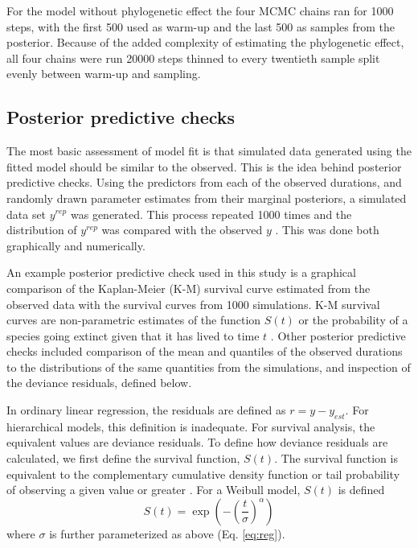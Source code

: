 \documentclass[12pt,letterpaper]{article}
\begin{document}
For the model without phylogenetic effect the four MCMC chains ran for 1000 steps, with the first 500 used as warm-up and the last 500 as samples from the posterior. Because of the added complexity of estimating the phylogenetic effect, all four chains were run 20000 steps thinned to every twentieth sample split evenly between warm-up and sampling. 



\subsection{Posterior predictive checks}

The most basic assessment of model fit is that simulated data generated using the fitted model should be similar to the observed. This is the idea behind posterior predictive checks. Using the predictors from each of the observed durations, and randomly drawn parameter estimates from their marginal posteriors, a simulated data set \(y^{rep}\) was generated. This process repeated 1000 times and the distribution of \(y^{rep}\) was compared with the observed \(y\) \citep{Gelman2013d}. This was done both graphically and numerically.

An example posterior predictive check used in this study is a graphical comparison of the Kaplan-Meier (K-M) survival curve estimated from the observed data with the survival curves from 1000 simulations. K-M survival curves are non-parametric estimates of the function \(S(t)\) or the probability of a species going extinct given that it has lived to time \(t\) \citep{Klein2003}. Other posterior predictive checks included comparison of the mean and quantiles of the observed durations to the distributions of the same quantities from the simulations, and inspection of the deviance residuals, defined below.

In ordinary linear regression, the residuals are defined as \(r = y - y_{est}\). For hierarchical models, this definition is inadequate. For survival analysis, the equivalent values are deviance residuals. To define how deviance residuals are calculated, we first define the survival function, \(S(t)\). The survival function is equivalent to the complementary cumulative density function or tail probability of observing a given value or greater \citep{Klein2003}. For a Weibull model, \(S(t)\) is defined
\begin{equation*}
  S(t) = \exp(-(\frac{t}{\sigma})^{\alpha})
\end{equation*}
where \(\sigma\) is further parameterized as above (Eq. \ref{eq:reg}).
\end{document}
